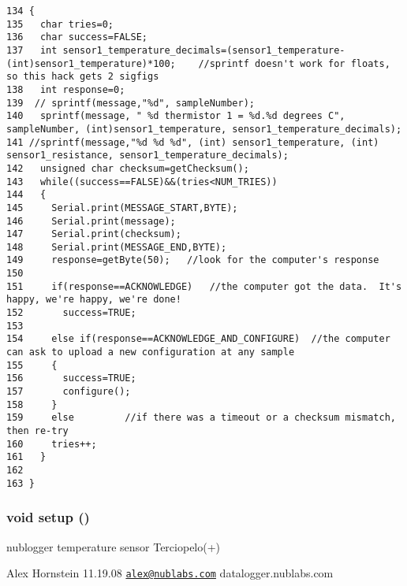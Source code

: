\begin{Code}\begin{verbatim}134 {
135   char tries=0;
136   char success=FALSE;
137   int sensor1_temperature_decimals=(sensor1_temperature-(int)sensor1_temperature)*100;    //sprintf doesn't work for floats, so this hack gets 2 sigfigs
138   int response=0;
139  // sprintf(message,"%d", sampleNumber);
140   sprintf(message, " %d thermistor 1 = %d.%d degrees C", sampleNumber, (int)sensor1_temperature, sensor1_temperature_decimals);
141 //sprintf(message,"%d %d %d", (int) sensor1_temperature, (int) sensor1_resistance, sensor1_temperature_decimals);
142   unsigned char checksum=getChecksum();
143   while((success==FALSE)&&(tries<NUM_TRIES))
144   {
145     Serial.print(MESSAGE_START,BYTE);
146     Serial.print(message);
147     Serial.print(checksum);
148     Serial.print(MESSAGE_END,BYTE);
149     response=getByte(50);   //look for the computer's response
150 
151     if(response==ACKNOWLEDGE)   //the computer got the data.  It's happy, we're happy, we're done!
152       success=TRUE;
153 
154     else if(response==ACKNOWLEDGE_AND_CONFIGURE)  //the computer can ask to upload a new configuration at any sample
155     {
156       success=TRUE;
157       configure();
158     }
159     else         //if there was a timeout or a checksum mismatch, then re-try
160     tries++;
161   }
162 
163 }
\end{verbatim}
\end{Code}


\hypertarget{applet_2temperature__sensor___terciopelo_8pde_4fc01d736fe50cf5b977f755b675f11d}{
\subsubsection[{setup}]{\setlength{\rightskip}{0pt plus 5cm}void setup ()}}
\label{applet_2temperature__sensor___terciopelo_8pde_4fc01d736fe50cf5b977f755b675f11d}


nublogger temperature sensor Terciopelo(+)

Alex Hornstein 11.19.08 \href{mailto:alex@nublabs.com}{\tt alex@nublabs.com} datalogger.nublabs.com

